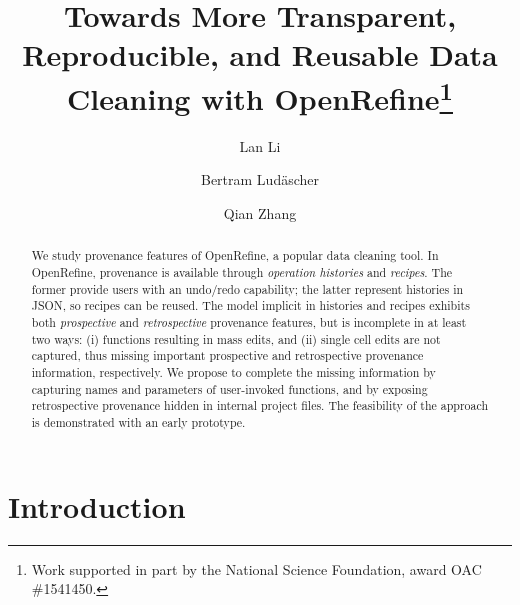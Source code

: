 \documentclass[runningheads]{llncs}
\begin{document}
\newcommand{\ywa}[1]{\textsf{#1}}

%
\title{Towards More Transparent, Reproducible, and Reusable Data Cleaning with OpenRefine\thanks{Work supported in part by the National Science Foundation, award OAC \#1541450.}}
%
%
\author{Lan Li \and
Bertram Lud\"ascher \and
Qian Zhang 
}
%
%

\maketitle              %

\begin{abstract}
  We study provenance features of OpenRefine, a popular data cleaning tool. In OpenRefine,
  provenance is available through \emph{operation histories} and \emph{recipes}. The former provide
  users with an undo/redo capability; the latter represent histories in JSON, so recipes can be
  reused. The model implicit in histories and recipes exhibits both \emph{prospective} and
  \emph{retrospective} provenance features, but is incomplete in at least two ways: (i) functions
  resulting in mass edits, and (ii) single cell edits are not captured, thus missing important
  prospective and retrospective provenance information, respectively. We propose to complete the
  missing information by capturing names and parameters of user-invoked functions, and by exposing
  retrospective provenance hidden in internal project files. The feasibility of the approach is
  demonstrated with an early prototype.  
 \end{abstract} 

\section{Introduction}
\end{document}
